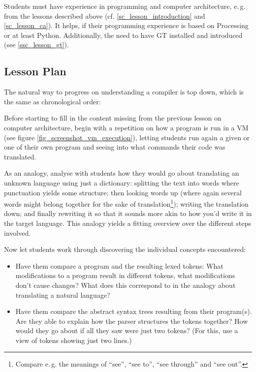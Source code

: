 Students must have experience in programming and computer architecture, e.\,g. from the lessons described above (cf. \ref{sc_lesson_introduction} and \ref{sc_lesson_ca}). It helps, if their programming experience is based on Processing or at least Python. Additionally, the need to have GT installed and introduced (see \ref{ssc_lesson_gt}).


\subsection{Lesson Plan}

The natural way to progress on understanding a compiler is top down, which is the same as chronological order:

\begin{instructions}
\item Before starting to fill in the content missing from the previous lesson on computer architecture, begin with a repetition on how a program is run in a VM (see figure \ref{fig_screenshot_vm_execution}), letting students run again a given or one of their own program and seeing into what commands their code was translated.
\item As an analogy, analyse with students how they would go about translating an unknown language using just a dictionary: splitting the text into words where punctuation yields some structure; then looking words up (where again several words might belong together for the sake of translation\footnote{Compare e.\,g. the meanings of ``see'', ``see to'', ``see through'' and ``see out''.}); writing the translation down; and finally rewriting it so that it sounds more akin to how you'd write it in the target language. This analogy yields a fitting overview over the different steps involved.
\item Now let students work through discovering the individual concepts encountered:
\begin{itemize}
\item Have them compare a program and the resulting lexed tokens: What modifications to a program result in different tokens, what modifications don't cause changes? What does this correspond to in the analogy about translating a natural language?
\item Have them compare the abstract syntax trees resulting from their program(s). Are they able to explain how the parser structures the tokens together? How would they go about if all they saw were just two tokens? (For this, use a view of tokens showing just two lines.)

\end{itemize}
\end{instructions}
